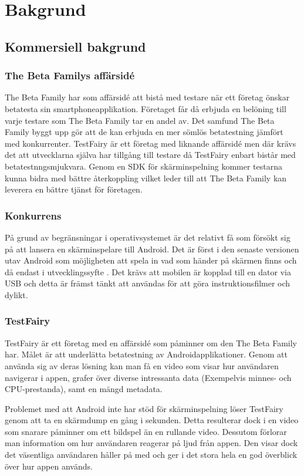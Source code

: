 \section{Bakgrund}
\subsection{Kommersiell bakgrund}
\subsubsection{The Beta Familys affärsidé}
The Beta Family har som affärsidé att bistå med testare när ett företag önskar betatesta sin smartphoneapplikation. Företaget får då erbjuda en belöning till varje testare som The Beta Family tar en andel av. Det samfund The Beta Family byggt upp gör att de kan erbjuda en mer sömlös betatestning jämfört med konkurrenter. TestFairy är ett företag med liknande affärsidé men där krävs det att utvecklarna själva har tillgång till testare då TestFairy enbart bistår med betatestnngsmjukvara. Genom en SDK för skärminspelning kommer testarna kunna bidra med bättre återkoppling vilket leder till att The Beta Family kan leverera en bättre tjänst för företagen.

\subsubsection{Konkurrens}
På grund av begränsningar i operativsystemet är det relativt få som försökt sig på att lansera en skärminspelare till Android. Det är först i den senaste versionen utav Android som möjligheten att spela in vad som händer på skärmen finns och då endast i utvecklingssyfte \parencite{kitkat}. Det krävs att mobilen är kopplad till en dator via USB och detta är främst tänkt att användas för att göra instruktionsfilmer och dylikt.

\subsubsection{TestFairy}
\label{testfairy}
TestFairy är ett företag med en affärsidé som påminner om den The Beta Family har. Målet är att underlätta betatestning av Androidapplikationer. Genom att använda sig av deras lösning kan man få en video som visar hur användaren navigerar i appen, grafer över diverse intressanta data (Exempelvis minnes- och CPU-prestanda), samt en mängd metadata.

Problemet med att Android inte har stöd för skärminspelning löser TestFairy genom att ta en skärmdump en gång i sekunden. Detta resulterar dock i en video som snarare påminner om ett bildspel än en rullande video. Dessutom förlorar man information om hur användaren reagerar på ljud från appen. Den visar dock det väsentliga användaren håller på med och ger i det stora hela en god överblick över hur appen används.

